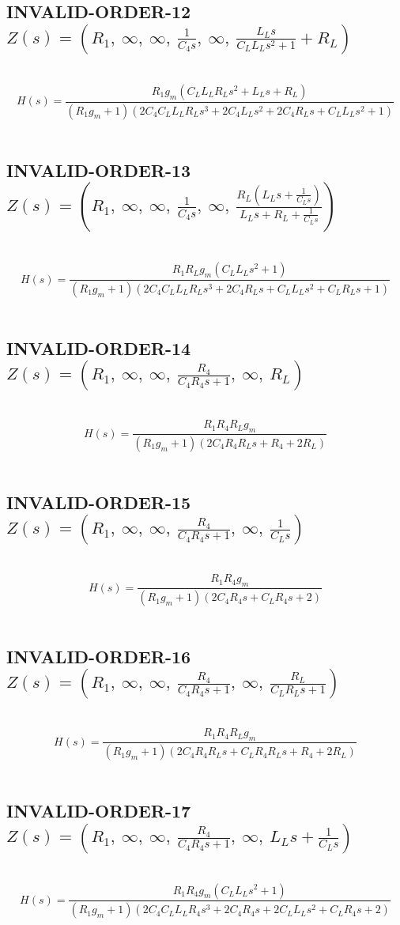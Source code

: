 \documentclass{article}
\begin{document}
\subsection{INVALID-ORDER-12 $Z(s) = \left( R_{1}, \  \infty, \  \infty, \  \frac{1}{C_{4} s}, \  \infty, \  \frac{L_{L} s}{C_{L} L_{L} s^{2} + 1} + R_{L}\right)$ } \ 
\textbf{\[H(s) = \frac{R_{1} g_{m} \left(C_{L} L_{L} R_{L} s^{2} + L_{L} s + R_{L}\right)}{\left(R_{1} g_{m} + 1\right) \left(2 C_{4} C_{L} L_{L} R_{L} s^{3} + 2 C_{4} L_{L} s^{2} + 2 C_{4} R_{L} s + C_{L} L_{L} s^{2} + 1\right)}\] } \ 
\subsection{INVALID-ORDER-13 $Z(s) = \left( R_{1}, \  \infty, \  \infty, \  \frac{1}{C_{4} s}, \  \infty, \  \frac{R_{L} \left(L_{L} s + \frac{1}{C_{L} s}\right)}{L_{L} s + R_{L} + \frac{1}{C_{L} s}}\right)$ } \ 
\textbf{\[H(s) = \frac{R_{1} R_{L} g_{m} \left(C_{L} L_{L} s^{2} + 1\right)}{\left(R_{1} g_{m} + 1\right) \left(2 C_{4} C_{L} L_{L} R_{L} s^{3} + 2 C_{4} R_{L} s + C_{L} L_{L} s^{2} + C_{L} R_{L} s + 1\right)}\] } \ 
\subsection{INVALID-ORDER-14 $Z(s) = \left( R_{1}, \  \infty, \  \infty, \  \frac{R_{4}}{C_{4} R_{4} s + 1}, \  \infty, \  R_{L}\right)$ } \ 
\textbf{\[H(s) = \frac{R_{1} R_{4} R_{L} g_{m}}{\left(R_{1} g_{m} + 1\right) \left(2 C_{4} R_{4} R_{L} s + R_{4} + 2 R_{L}\right)}\] } \ 
\subsection{INVALID-ORDER-15 $Z(s) = \left( R_{1}, \  \infty, \  \infty, \  \frac{R_{4}}{C_{4} R_{4} s + 1}, \  \infty, \  \frac{1}{C_{L} s}\right)$ } \ 
\textbf{\[H(s) = \frac{R_{1} R_{4} g_{m}}{\left(R_{1} g_{m} + 1\right) \left(2 C_{4} R_{4} s + C_{L} R_{4} s + 2\right)}\] } \ 
\subsection{INVALID-ORDER-16 $Z(s) = \left( R_{1}, \  \infty, \  \infty, \  \frac{R_{4}}{C_{4} R_{4} s + 1}, \  \infty, \  \frac{R_{L}}{C_{L} R_{L} s + 1}\right)$ } \ 
\textbf{\[H(s) = \frac{R_{1} R_{4} R_{L} g_{m}}{\left(R_{1} g_{m} + 1\right) \left(2 C_{4} R_{4} R_{L} s + C_{L} R_{4} R_{L} s + R_{4} + 2 R_{L}\right)}\] } \ 
\subsection{INVALID-ORDER-17 $Z(s) = \left( R_{1}, \  \infty, \  \infty, \  \frac{R_{4}}{C_{4} R_{4} s + 1}, \  \infty, \  L_{L} s + \frac{1}{C_{L} s}\right)$ } \ 
\textbf{\[H(s) = \frac{R_{1} R_{4} g_{m} \left(C_{L} L_{L} s^{2} + 1\right)}{\left(R_{1} g_{m} + 1\right) \left(2 C_{4} C_{L} L_{L} R_{4} s^{3} + 2 C_{4} R_{4} s + 2 C_{L} L_{L} s^{2} + C_{L} R_{4} s + 2\right)}\] } \ 
\end{document}
